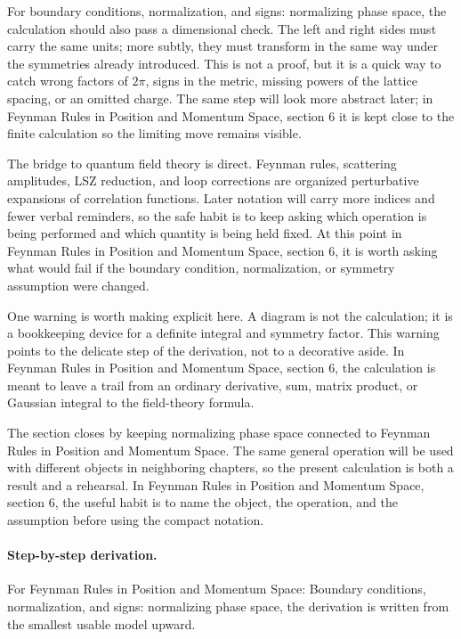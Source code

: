 For boundary conditions, normalization, and signs: normalizing phase space, the calculation should also pass a dimensional check.  The left and right sides must carry the same units; more subtly, they must transform in the same way under the symmetries already introduced.  This is not a proof, but it is a quick way to catch wrong factors of \(2\pi\), signs in the metric, missing powers of the lattice spacing, or an omitted charge.  The same step will look more abstract later; in Feynman Rules in Position and Momentum Space, section 6 it is kept close to the finite calculation so the limiting move remains visible.

The bridge to quantum field theory is direct.  Feynman rules, scattering amplitudes, LSZ reduction, and loop corrections are organized perturbative expansions of correlation functions.  Later notation will carry more indices and fewer verbal reminders, so the safe habit is to keep asking which operation is being performed and which quantity is being held fixed.  At this point in Feynman Rules in Position and Momentum Space, section 6, it is worth asking what would fail if the boundary condition, normalization, or symmetry assumption were changed.

One warning is worth making explicit here.  A diagram is not the calculation; it is a bookkeeping device for a definite integral and symmetry factor.  This warning points to the delicate step of the derivation, not to a decorative aside.  In Feynman Rules in Position and Momentum Space, section 6, the calculation is meant to leave a trail from an ordinary derivative, sum, matrix product, or Gaussian integral to the field-theory formula.

The section closes by keeping normalizing phase space connected to Feynman Rules in Position and Momentum Space.  The same general operation will be used with different objects in neighboring chapters, so the present calculation is both a result and a rehearsal.  In Feynman Rules in Position and Momentum Space, section 6, the useful habit is to name the object, the operation, and the assumption before using the compact notation.



\paragraph{Step-by-step derivation.}

For Feynman Rules in Position and Momentum Space: Boundary conditions, normalization, and signs: normalizing phase space, the derivation is written from the smallest usable model upward.

